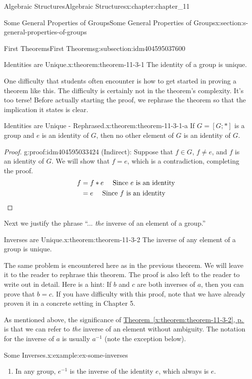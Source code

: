 \documentclass[twoside,10pt,]{book}
\newcommand{\xreffont}{\relax}
\newcommand{\qedhere}{\relax}
\numberwithin{equation}{section}
\begin{document}
\begin{chapterptx}{Algebraic Structures}{}{Algebraic Structures}{}{}{x:chapter:chapter_11}
\begin{sectionptx}{Some General Properties of Groups}{}{Some General Properties of Groups}{}{}{x:section:s-general-properties-of-groups}
\begin{subsectionptx}{First Theorems}{}{First Theorems}{}{}{g:subsection:idm404595037600}
\begin{theorem}{Identities are Unique.}{}{x:theorem:theorem-11-3-1}
The identity of a group is unique.%
\end{theorem}
One difficulty that students often encounter is how to get started in proving a theorem like this. The difficulty is certainly not in the theorem's complexity. It's too terse! Before actually starting the proof, we rephrase the theorem so that the implication it states is clear.%
\begin{theorem}{Identities are Unique - Rephrased.}{}{x:theorem:theorem-11-3-1-a}%
If \(G= [G; *]\) is a group and \(e\) is an identity of \(G\), then no other element of \(G\) is an identity of \(G\).%
\end{theorem}
\begin{proof}{}{g:proof:idm404595033424}
(Indirect): Suppose that \(f\in  G\), \(f\neq e\), and \(f\) is an identity of \(G\). We will show that \(f = e\), which is a contradiction, completing the proof.%
\begin{equation*}
\begin{split}
f  &= f * e \quad \textrm{  Since }e\textrm{ is an identity}\\
&= e  \quad \textrm{  Since }f\textrm{ is an identity}
\end{split}\qedhere
\end{equation*}
%
\end{proof}
Next we justify the phrase ``... \emph{the} inverse of an element of a group.''%
\begin{theorem}{Inverses are Unique.}{}{x:theorem:theorem-11-3-2}%
The inverse of any element of a group is unique.%
\end{theorem}
The same problem is encountered here as in the previous theorem. We will leave it to the reader to rephrase this theorem. The proof is also left to the reader to write out in detail. Here is a hint: If \(b\) and \(c\) are both inverses of \(a\), then you can prove that \(b = c\).  If you have difficulty with this proof, note that we have already proven it in a concrete setting in Chapter 5.%
\par
As mentioned above, the significance of \hyperref[x:theorem:theorem-11-3-2]{Theorem~{\xreffont\ref{x:theorem:theorem-11-3-2}}, p.\,\pageref{x:theorem:theorem-11-3-2}} is that we can refer to \emph{the} inverse of an element without ambiguity. The notation for the inverse of \(a\) is usually \(a^{-1}\) (note the exception below).%
\begin{example}{Some Inverses.}{x:example:ex-some-inverses}%
%
\begin{enumerate}[label=(\alph*)]
\item{}In any group, \(e^{-1}\) is the inverse of the identity \(e\), which always is \(e\).%

\end{enumerate}
\end{example}
\end{subsectionptx}
\end{sectionptx}
\end{chapterptx}
\end{document}

